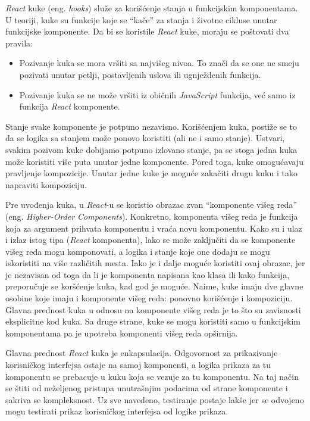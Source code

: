 \textit{React} kuke (eng. \textit{hooks}) služe za korišćenje stanja u funkcijskim komponentama. U teoriji, kuke su funkcije 
koje se “kače” za stanja i životne cikluse unutar funkcijske komponente. Da bi se koristile \textit{React} kuke, moraju se 
poštovati dva pravila:
\begin{itemize}
    \item Pozivanje kuka se mora vršiti sa najvišeg nivoa. To znači da se one ne smeju pozivati unutar petlji, 
    postavljenih uslova ili ugnježdenih funkcija.
    \item Pozivanje kuka se ne može vršiti iz običnih \textit{JavaScript} funkcija, već samo iz funkcija \textit{React} komponente.
\end{itemize}

Stanje svake komponente je potpuno nezavisno. Korišćenjem kuka, postiže se to da se logika sa stanjem može ponovo koristiti 
(ali ne i samo stanje). Ustvari, svakim pozivom kuke dobijamo potpuno izlovano stanje, pa se stoga jedna kuka može koristiti 
više puta unutar jedne komponente. Pored toga, kuke omogućavaju pravljenje kompozicije. Unutar jedne kuke je moguće zakačiti 
drugu kuku i tako napraviti kompoziciju. 

Pre uvođenja kuka, u \textit{React}-u se koristio obrazac zvan “komponente višeg reda” (eng. \textit{Higher-Order Components}). 
Konkretno, komponenta višeg reda je funkcija koja za argument prihvata komponentu i vraća novu komponentu. Kako su i ulaz i 
izlaz istog tipa (\textit{React} komponenta), lako se može zaključiti da se komponente višeg reda mogu komponovati, a logika i 
stanje koje one dodaju se mogu iskoristiti na više različitih mesta. Iako je i dalje moguće koristiti ovaj obrazac, jer je 
nezavisan od toga da li je komponenta napisana kao klasa ili kako funkcija, preporučuje se koršćenje kuka, kad god je moguće. 
Naime, kuke imaju dve glavne osobine koje imaju i komponente višeg reda: ponovno korišćenje i kompoziciju. Glavna prednost kuka 
u odnosu na komponente višeg reda je to što su zavisnosti eksplicitne kod kuka. Sa druge strane, kuke se mogu koristiti samo u 
funkcijskim komponentama pa je upotreba komponenti višeg reda opširnija.

Glavna prednost \textit{React} kuka je enkapsulacija. Odgovornost za prikazivanje korisničkog interfejsa ostaje na samoj 
komponenti, a logika prikaza za tu komponentu se prebacuje u kuku koja se vezuje za tu komponentu. Na taj način se štiti 
od neželjenog pristupa unutrašnjim podacima od strane komponente i sakriva se kompleksnost. Uz sve navedeno, 
testiranje postaje lakše jer se odvojeno mogu testirati prikaz korisničkog %
interfejsa od logike prikaza. 

